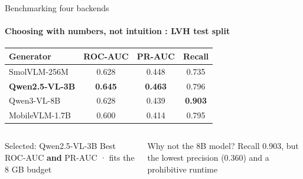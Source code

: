 \begin{frame}{Benchmarking four backends}
  \framesubtitle{Choosing with numbers, not intuition : LVH test split}
  \begin{enslide}
  \centering
  {\small
  \begin{tabular}{@{}l c c c@{}}
    \toprule
    \textbf{Generator} & \textbf{ROC-AUC} & \textbf{PR-AUC} & \textbf{Recall} \\
    \midrule
    SmolVLM-256M          & 0.628 & 0.448 & 0.735 \\
    \rowcolor{AubayOrange!14}
    \textbf{Qwen2.5-VL-3B} & \textbf{0.645} & \textbf{0.463} & 0.796 \\
    Qwen3-VL-8B           & 0.628 & 0.439 & \textbf{0.903} \\
    MobileVLM-1.7B        & 0.600 & 0.414 & 0.795 \\
    \bottomrule
  \end{tabular}}
  \vspace{0.45cm}

  \begin{columns}[T,onlytextwidth]
      \begin{block}{Selected: Qwen2.5-VL-3B}
        \small Best ROC-AUC \textbf{and} PR-AUC · fits the 8 GB budget
      \end{block}
      \begin{alertblock}{Why not the 8B model?}
        \small Recall 0.903, but the lowest precision (0.360) and a prohibitive runtime
      \end{alertblock}
  \end{columns}
  \end{enslide}
\end{frame}

